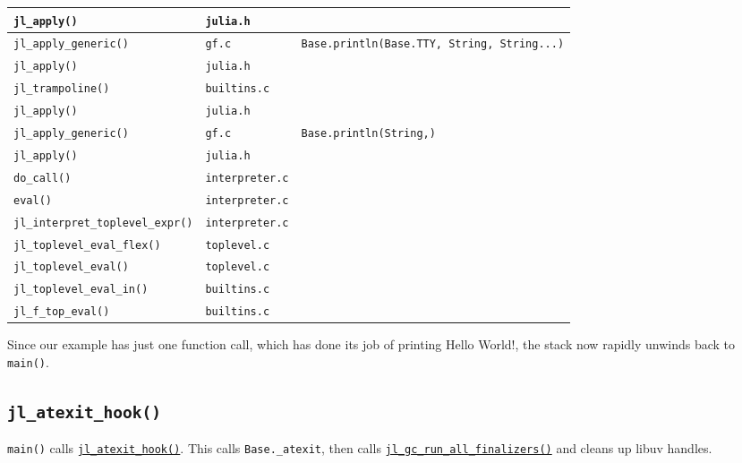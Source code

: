 \begin{table}[h]
\begin{tabulary}{\linewidth}{|L|L|L|}
\hline
\texttt{jl\_apply()} & \texttt{julia.h} &  \\
\hline
\texttt{jl\_apply\_generic()} & \texttt{gf.c} & \texttt{Base.println(Base.TTY, String, String...)} \\
\hline
\texttt{jl\_apply()} & \texttt{julia.h} &  \\
\hline
\texttt{jl\_trampoline()} & \texttt{builtins.c} &  \\
\hline
\texttt{jl\_apply()} & \texttt{julia.h} &  \\
\hline
\texttt{jl\_apply\_generic()} & \texttt{gf.c} & \texttt{Base.println(String,)} \\
\hline
\texttt{jl\_apply()} & \texttt{julia.h} &  \\
\hline
\texttt{do\_call()} & \texttt{interpreter.c} &  \\
\hline
\texttt{eval()} & \texttt{interpreter.c} &  \\
\hline
\texttt{jl\_interpret\_toplevel\_expr()} & \texttt{interpreter.c} &  \\
\hline
\texttt{jl\_toplevel\_eval\_flex()} & \texttt{toplevel.c} &  \\
\hline
\texttt{jl\_toplevel\_eval()} & \texttt{toplevel.c} &  \\
\hline
\texttt{jl\_toplevel\_eval\_in()} & \texttt{builtins.c} &  \\
\hline
\texttt{jl\_f\_top\_eval()} & \texttt{builtins.c} &  \\
\hline
\end{tabulary}

\end{table}



Since our example has just one function call, which has done its job of printing {\textquotedbl}Hello World!{\textquotedbl}, the stack now rapidly unwinds back to \texttt{main()}.



\hypertarget{8766302654766843311}{}


\subsection{\texttt{jl\_atexit\_hook()}}



\texttt{main()} calls \href{https://github.com/JuliaLang/julia/blob/master/src/init.c}{\texttt{jl\_atexit\_hook()}}. This calls \texttt{Base.\_atexit}, then calls \href{https://github.com/JuliaLang/julia/blob/master/src/gc.c}{\texttt{jl\_gc\_run\_all\_finalizers()}} and cleans up libuv handles.



